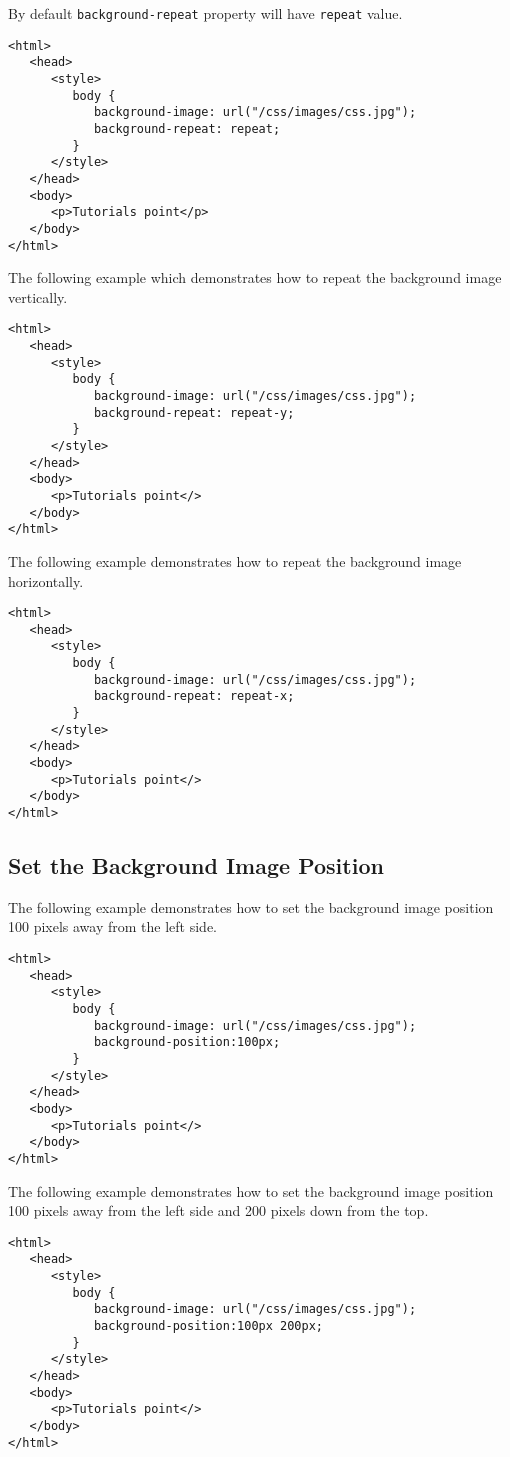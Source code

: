 \documentclass[a4paper,oneside]{book}
\numberwithin{equation}{chapter}
\begin{document}
By default \texttt{background-repeat} property will have \texttt{repeat} value.
\begin{verbatim}
<html>
   <head>
      <style>
         body {
            background-image: url("/css/images/css.jpg");
            background-repeat: repeat;
         }
      </style>
   </head>
   <body>
      <p>Tutorials point</p>
   </body>
</html>
\end{verbatim}

The following example which demonstrates how to repeat the background image vertically.
\begin{verbatim}
<html>
   <head>
      <style>
         body {
            background-image: url("/css/images/css.jpg");
            background-repeat: repeat-y;
         }
      </style>
   </head>
   <body>
      <p>Tutorials point</>
   </body>
</html>
\end{verbatim}

The following example demonstrates how to repeat the background image horizontally.
\begin{verbatim}
<html>
   <head>
      <style>
         body {
            background-image: url("/css/images/css.jpg");
            background-repeat: repeat-x;
         }
      </style>
   </head>
   <body>
      <p>Tutorials point</>
   </body>
</html>
\end{verbatim}
\subsection{Set the Background Image Position}
The following example demonstrates how to set the background image position 100 pixels away from the left side.
\begin{verbatim}
<html>
   <head>
      <style>
         body {
            background-image: url("/css/images/css.jpg");
            background-position:100px;
         }
      </style>
   </head>
   <body>
      <p>Tutorials point</>
   </body>
</html>
\end{verbatim}

The following example demonstrates how to set the background image position 100 pixels away from the left side and 200 pixels down from the top.
\begin{verbatim}
<html>
   <head>
      <style>
         body {
            background-image: url("/css/images/css.jpg");
            background-position:100px 200px;
         }
      </style>
   </head>
   <body>
      <p>Tutorials point</>
   </body>
</html>
\end{verbatim}
\end{document}
